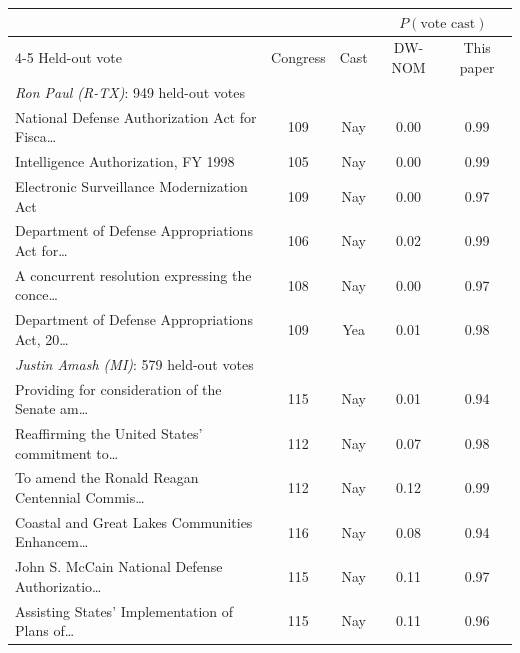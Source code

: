 \begin{tabular}{p{7.2cm}cccc}
\toprule
 & & & \multicolumn{2}{c}{$P(\text{vote cast})$} \\
\cmidrule(lr){4-5}
Held-out vote & Congress & Cast & DW-NOM & This paper \\
\midrule
\multicolumn{5}{l}{\emph{Ron Paul (R-TX)}: 949 held-out votes} \\
\quad National Defense Authorization Act for Fisca\dots & 109 & Nay & 0.00 & 0.99 \\
\quad Intelligence Authorization, FY 1998 & 105 & Nay & 0.00 & 0.99 \\
\quad Electronic Surveillance Modernization Act & 109 & Nay & 0.00 & 0.97 \\
\quad Department of Defense Appropriations Act for\dots & 106 & Nay & 0.02 & 0.99 \\
\quad A concurrent resolution expressing the conce\dots & 108 & Nay & 0.00 & 0.97 \\
\quad Department of Defense Appropriations Act, 20\dots & 109 & Yea & 0.01 & 0.98 \\
\multicolumn{5}{l}{\emph{Justin Amash (MI)}: 579 held-out votes} \\
\quad Providing for consideration of the Senate am\dots & 115 & Nay & 0.01 & 0.94 \\
\quad Reaffirming the United States' commitment to\dots & 112 & Nay & 0.07 & 0.98 \\
\quad To amend the Ronald Reagan Centennial Commis\dots & 112 & Nay & 0.12 & 0.99 \\
\quad Coastal and Great Lakes Communities Enhancem\dots & 116 & Nay & 0.08 & 0.94 \\
\quad John S. McCain National Defense Authorizatio\dots & 115 & Nay & 0.11 & 0.97 \\
\quad Assisting States' Implementation of Plans of\dots & 115 & Nay & 0.11 & 0.96 \\
\bottomrule
\end{tabular}

